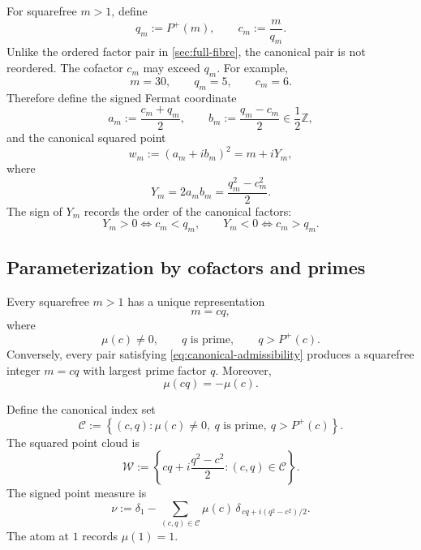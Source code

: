 \documentclass[11pt]{article}
\theoremstyle{definition}
\newcommand{\Pplus}{P^{+}}
\newcommand{\1}{\mathbf{1}}
\newcommand{\Z}{\mathbb{Z}}
\begin{document}
For squarefree $m>1$, define
\begin{equation}
 q_m:=\Pplus(m),
 \qquad
 c_m:=\frac{m}{q_m}.
 \label{eq:canonical-cq}
\end{equation}
Unlike the ordered factor pair in \cref{sec:full-fibre}, the canonical pair is not reordered.  The cofactor $c_m$ may exceed $q_m$.  For example,
\[
 m=30,
 \qquad
 q_m=5,
 \qquad
 c_m=6.
\]
Therefore define the signed Fermat coordinate
\begin{equation}
 a_m:=\frac{c_m+q_m}{2},
 \qquad
 b_m:=\frac{q_m-c_m}{2}\in\frac12\Z,
 \label{eq:signed-Fermat}
\end{equation}
and the canonical squared point
\begin{equation}
 w_m:=(a_m+ib_m)^2
 =m+iY_m,
 \label{eq:canonical-w}
\end{equation}
where
\begin{equation}
 \boxed{Y_m=2a_mb_m=\frac{q_m^2-c_m^2}{2}.}
 \label{eq:signed-Y}
\end{equation}
The sign of $Y_m$ records the order of the canonical factors:
\begin{equation}
 Y_m>0\iff c_m<q_m,
 \qquad
 Y_m<0\iff c_m>q_m.
 \label{eq:Y-sign}
\end{equation}

\subsection{Parameterization by cofactors and primes}

Every squarefree $m>1$ has a unique representation
\begin{equation}
 m=cq,
 \label{eq:cq-general}
\end{equation}
where
\begin{equation}
 \mu(c)\ne0,
 \qquad
 q\text{ is prime},
 \qquad
 q>\Pplus(c).
 \label{eq:canonical-admissibility}
\end{equation}
Conversely, every pair satisfying \cref{eq:canonical-admissibility} produces a squarefree integer $m=cq$ with largest prime factor $q$.  Moreover,
\begin{equation}
 \mu(cq)=-\mu(c).
 \label{eq:canonical-sign}
\end{equation}

Define the canonical index set
\begin{equation}
 \mathscr C
 :=
 \left\{
 (c,q):
 \mu(c)\ne0,
 \ q\text{ is prime},
 \ q>\Pplus(c)
 \right\}.
 \label{eq:canonical-index}
\end{equation}
The squared point cloud is
\begin{equation}
 \mathscr W
 :=
 \left\{
 cq+i\frac{q^2-c^2}{2}:(c,q)\in\mathscr C
 \right\}.
 \label{eq:canonical-cloud}
\end{equation}
The signed point measure is
\begin{equation}
 \nu
 :=
 \delta_1
 -
 \sum_{(c,q)\in\mathscr C}
 \mu(c)\,
 \delta_{\,cq+i(q^2-c^2)/2}.
 \label{eq:signed-measure}
\end{equation}
The atom at $1$ records $\mu(1)=1$.
\end{document}
